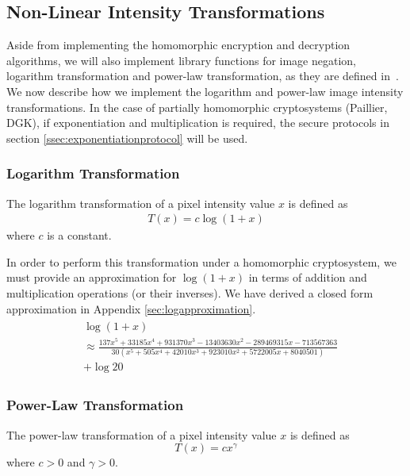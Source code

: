 \subsection{Non-Linear Intensity Transformations}
Aside from implementing the homomorphic encryption and decryption algorithms, we will also implement library functions for image negation, logarithm transformation and power-law transformation, as they are defined in~\cite{gonzalez_digital_2008}.
We now describe how we implement the logarithm and power-law image intensity transformations. In the case of partially homomorphic cryptosystems (Paillier, DGK), if  exponentiation and multiplication is required, the secure protocols in section \ref{ssec:exponentiationprotocol} will be used.

\subsubsection{Logarithm Transformation}
The logarithm transformation of a pixel intensity value $x$ is defined as
\begin{align}
	T\left(x\right) = c \log\left(1 + x\right)
\end{align}
where $c$ is a constant.

In order to perform this transformation under a homomorphic cryptosystem, we must provide an approximation for $\log\left(1 + x\right)$ in terms of addition and multiplication operations (or their inverses). We have derived a closed form approximation in Appendix \ref{sec:logapproximation}.
\begin{align}
	\label{eq:scaledquadraturech3}
  \begin{split}
    &\log(1+x) \\
    &\approx \frac{137x^5 + 33185x^4 + 931370x^3 - 13403630x^2 - 289469315x - 713567363}
	{30(x^5 + 505x^4 + 42010x^3 + 923010x^2 + 5722005x + 8040501)} \\
	&+ \log{20}
  \end{split}
\end{align}

\subsubsection{Power-Law Transformation}
The power-law transformation of a pixel intensity value $x$ is defined as
\begin{equation}
    T\left(x\right) = cx^{\gamma}
\end{equation}
where $c>0$ and $\gamma > 0$.

